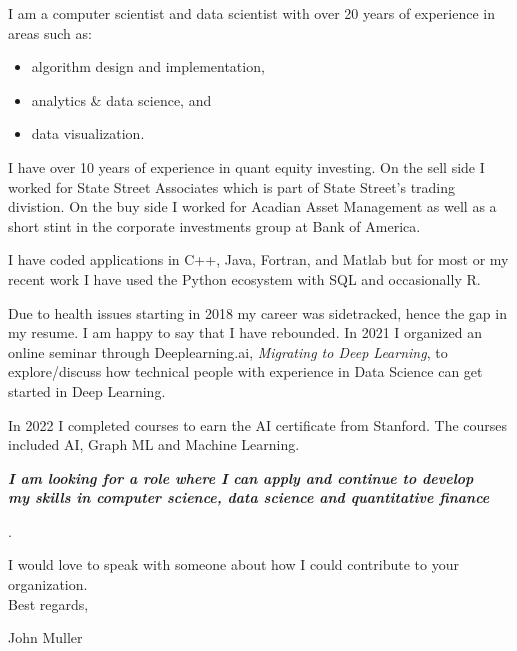 \documentclass{article}
\begin{document}
\noindent
I am a computer scientist and data scientist with over 20 years of experience in areas such as:
\begin{itemize}[noitemsep]
 \item algorithm design and implementation,
 \item analytics \& data science, and
 \item data visualization.
\end{itemize}

I have over 10 years of experience in quant equity investing.
On the sell side I worked for State Street Associates which is part of State Street's trading divistion.
On the buy side I worked for Acadian Asset Management as well as a short stint 
  in the corporate investments group at Bank of America.
  
I have coded applications in C++, Java, Fortran, and Matlab but for most or my recent work I have used the Python ecosystem with SQL and occasionally R.
\vspace{0.1in}


    
\vspace{0.1in}
Due to health issues starting in 2018 my career was sidetracked, hence the gap in my resume.
I am happy to say that I have rebounded. In 2021 I organized an online seminar through Deeplearning.ai, \emph{Migrating to Deep Learning},
to explore/discuss how technical people with experience in Data Science can get started in Deep Learning.


In 2022 I completed courses to earn the AI certificate from Stanford.
The courses included AI, Graph ML and Machine Learning.  

\vspace{0.1in}
\begin{center}
\textbf{\emph{I am  looking for a role where I can apply and  continue to develop \\
my skills in computer science, data science and quantitative finance}}
\end{center}.
\vspace{0.1in}

\noindent I would love to speak with someone about how I could contribute to your organization.\\
Best regards,

John Muller
\end{document}
